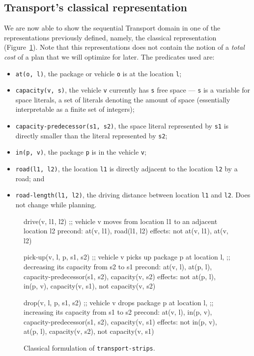 \subsection{Transport's classical representation}\label{transport-classical-representation}

We are now able to show the sequential Transport domain in one of the representations
previously defined, namely,
the classical representation (Figure~\ref{code:classical-strips}).
Note that this representations does not contain the notion of a \textit{total cost}
of a plan that we will optimize for later.
The predicates used are:
\begin{itemize}
\item \verb+at(o, l)+, the package or vehicle \verb+o+ is at the
location \verb+l+;
\item \verb+capacity(v, s)+, the vehicle \verb+v+ currently has \verb+s+ free space --- \verb+s+ is a variable for space literals, a set of literals denoting the amount of space (essentially interpretable as a finite set of integers);
\item \verb+capacity-predecessor(s1, s2)+, the space literal represented by \verb+s1+
is directly smaller than the literal represented by \verb+s2+;
\item \verb+in(p, v)+, the package \verb+p+ is in the vehicle \verb+v+;
\item \verb+road(l1, l2)+, the location \verb+l1+ is directly adjacent to the location
\verb+l2+ by a road; and
\item \verb+road-length(l1, l2)+, the driving distance between location \verb+l1+
and \verb+l2+. Does not change while planning.
\end{itemize}

\begin{figure}[tbp]
\begin{code}
drive(v, l1, l2)
  ;; vehicle v moves from location l1 to an adjacent location l2
  precond: at(v, l1), road(l1, l2)
  effects: not at(v, l1), at(v, l2)

pick-up(v, l, p, s1, s2)
  ;; vehicle v picks up package p at location l,
  ;; decreasing its capacity from s2 to s1
  precond: at(v, l), at(p, l), capacity-predecessor(s1, s2),
           capacity(v, s2)
  effects: not at(p, l), in(p, v), capacity(v, s1),
           not capacity(v, s2)
  
drop(v, l, p, s1, s2)
  ;; vehicle v drops package p at location l,
  ;; increasing its capacity from s1 to s2
  precond: at(v, l), in(p, v), capacity-predecessor(s1, s2),
           capacity(v, s1)
  effects: not in(p, v), at(p, l), capacity(v, s2),
           not capacity(v, s1)
\end{code}
\caption{Classical formulation of \texttt{transport-strips}.}
\label{code:classical-strips}
\end{figure}


